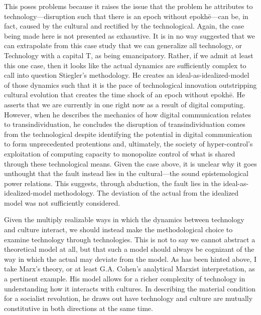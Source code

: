 \documentclass[letterpaper,notitlepage,12pt]{article}
\begin{document}
This poses problems because it raises the issue that the problem he attributes
to technology---disruption such that there is an epoch without epokh\={e}---can
be, in fact, caused by the cultural and rectified by the technological.
Again, the case being made here is not presented as exhaustive.
It is in no way suggested that we can extrapolate from this case study that we
can generalize all technology, or Technology with a capital T, as being
emancipatory.
Rather, if we admit at least this one case, then it looks like the actual
dynamics are sufficiently complex to call into question Stiegler's methodology.
He creates an ideal-as-idealized-model of those dynamics such that it is the
pace of technological innovation outstripping cultural evolution that creates
the time shock of an epoch without epokh\={e}.
He asserts that we are currently in one right now as a result of digital
computing.
However, when he describes the mechanics of how digital communication relates to
transindividuation, he concludes the disruption of transindividuation comes from
the technological despite identifying the potential in digital communication to
form unprecedented protentions and, ultimately, the society of hyper-control's
exploitation of computing capacity to monopolize control of what is shared
through these technological means.
Given the case above, it is unclear why it goes unthought that the fault instead
lies in the cultural---the sound epistemological power relations.
This suggests, through abduction, the fault lies in the ideal-as-idealized-model
methodology.
The deviation of the actual from the idealized model was not sufficiently
considered.

Given the multiply realizable ways in which the dynamics between technology and
culture interact, we should instead make the methodological choice to examine
technology through technologies.
This is not to say we cannot abstract a theoretical model at all, but that such
a model should always be cognizant of the way in which the actual may deviate
from the model.
As has been hinted above, I take Marx's theory, or at least G.A. Cohen's
analytical Marxist interpretation, as a pertinent example.
His model allows for a richer complexity of technology in understanding how it
interacts with cultures.
In describing the material condition for a socialist revolution, he draws out
have technology and culture are mutually constitutive in both directions at the
same time.
\end{document}
